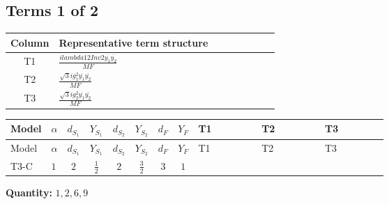 \documentclass[8pt]{article}
\begin{document}
\begin{landscape}
\subsection*{Terms 1 of 2}
\begin{center}
\begin{tabular}{@{}c >{\raggedright\arraybackslash}p{0.82\linewidth}@{}}
\toprule
Column & Representative term structure \\
\midrule
T1 & \(\displaystyle \frac{i lambda12Inv2 \overline{y_{1}} \overline{y_{2}}}{MF}\) \\
\midrule
T2 & \(\displaystyle \frac{\sqrt{3} i g_{1}^{2} \overline{y_{1}} \overline{y_{2}}}{MF}\) \\
\midrule
T3 & \(\displaystyle \frac{\sqrt{3} i g_{2}^{2} \overline{y_{1}} \overline{y_{2}}}{MF}\) \\
\midrule
\bottomrule
\end{tabular}
\end{center}
\smallskip
\tiny
\begin{longtable}{@{}llcccccc >{\raggedright\arraybackslash}p{0.21\linewidth} >{\raggedright\arraybackslash}p{0.21\linewidth} >{\raggedright\arraybackslash}p{0.21\linewidth}@{}}
\toprule
Model & $\alpha$ & $d_{S_1}$ & $Y_{S_1}$ & $d_{S_2}$ & $Y_{S_2}$ & $d_F$ & $Y_F$ & T1 & T2 & T3 \\
\midrule
\endfirsthead
\toprule
Model & $\alpha$ & $d_{S_1}$ & $Y_{S_1}$ & $d_{S_2}$ & $Y_{S_2}$ & $d_F$ & $Y_F$ & T1 & T2 & T3 \\
\midrule
\endhead
T3-C & $1$ & $2$ & $\frac{1}{2}$ & $2$ & $\frac{3}{2}$ & $3$ & $1$ & \scriptsize\adjustbox{max width=\linewidth}{$\begin{gathered} \frac{i lambda12Inv2 \overline{y_{1}} \overline{y_{2}}}{6 MF}\end{gathered}$} & \scriptsize\adjustbox{max width=\linewidth}{$\begin{gathered} \frac{\sqrt{3} i g_{1}^{2} \overline{y_{1}} \overline{y_{2}}}{4 MF}\end{gathered}$} & \scriptsize\adjustbox{max width=\linewidth}{$\begin{gathered} \frac{\sqrt{3} i g_{2}^{2} \overline{y_{1}} \overline{y_{2}}}{8 MF}\end{gathered}$} \\
\midrule
\bottomrule
\end{longtable}
\clearpage
\noindent\textbf{Quantity: }$\mathrm{1,2,6,9}$\par\smallskip

\end{landscape}
\end{document}

